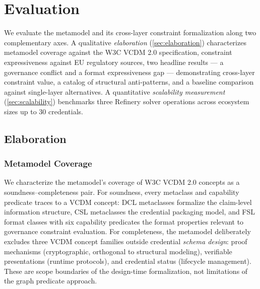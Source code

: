 
\section{Evaluation}\label{evaluation}

\label{sec:evaluation}

We evaluate the metamodel and its cross-layer constraint formalization along two complementary axes. A qualitative \emph{elaboration} (\autoref{sec:elaboration}) characterizes metamodel coverage against the W3C VCDM 2.0 specification, constraint expressiveness against EU regulatory sources, two headline results --- a governance conflict and a format expressiveness gap --- demonstrating cross-layer constraint value, a catalog of structural anti-patterns, and a baseline comparison against single-layer alternatives. A quantitative \emph{scalability measurement} (\autoref{sec:scalability}) benchmarks three Refinery solver operations across ecosystem sizes up to 30 credentials.

\subsection{Elaboration}\label{elaboration}

\label{sec:elaboration}

\subsubsection{Metamodel Coverage}\label{metamodel-coverage}

\label{sec:coverage}

We characterize the metamodel's coverage of W3C VCDM 2.0 concepts \citep{manu_verifiable_2025} as a soundness--completeness pair. For soundness, every metaclass and capability predicate traces to a VCDM concept: DCL metaclasses formalize the claim-level information structure, CSL metaclasses the credential packaging model, and FSL format classes with six capability predicates the format properties relevant to governance constraint evaluation. For completeness, the metamodel deliberately excludes three VCDM concept families outside credential \emph{schema design}: proof mechanisms (cryptographic, orthogonal to structural modeling), verifiable presentations (runtime protocols), and credential status (lifecycle management). These are scope boundaries of the design-time formalization, not limitations of the graph predicate approach.

